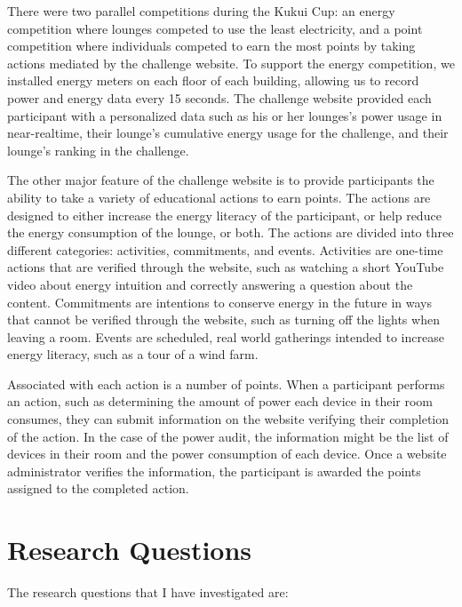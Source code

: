 There were two parallel competitions during the Kukui Cup: an energy competition where lounges competed to use the least electricity, and a point competition where individuals competed to earn the most points by taking actions mediated by the challenge website. To support the energy competition, we installed energy meters on each floor of each building, allowing us to record power and energy data every 15 seconds. The challenge website provided each participant with a personalized data such as his or her lounges's power usage in near-realtime, their lounge's cumulative energy usage for the challenge, and their lounge's ranking in the challenge.

The other major feature of the challenge website is to provide participants the ability to take a variety of educational actions to earn points. The actions are designed to either increase the energy literacy of the participant, or help reduce the energy consumption of the lounge, or both. The actions are divided into three different categories: activities, commitments, and events. Activities are one-time actions that are verified through the website, such as watching a short YouTube video about energy intuition and correctly answering a question about the content. Commitments are intentions to conserve energy in the future in ways that cannot be verified through the website, such as turning off the lights when leaving a room. Events are scheduled, real world gatherings intended to increase energy literacy, such as a tour of a wind farm.

Associated with each action is a number of points. When a participant performs an action, such as determining the amount of power each device in their room consumes, they can submit information on the website verifying their completion of the action. In the case of the power audit, the information might be the list of devices in their room and the power consumption of each device. Once a website administrator verifies the information, the participant is awarded the points assigned to the completed action.


\section{Research Questions}

The research questions that I have investigated are:

